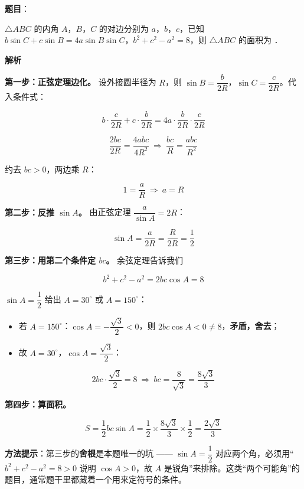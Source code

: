 \begin{answer}

\textbf{题目}：

$\triangle ABC$ 的内角 $A$，$B$，$C$ 的对边分别为 $a$，$b$，$c$，已知 $b\sin C+c\sin B=4a\sin B\sin C$，$b^{2}+c^{2}-a^{2}=8$，则 $\triangle ABC$ 的面积为 \gkblank{}．

\textbf{解析}

\textbf{第一步：正弦定理边化。} 设外接圆半径为 $R$，则 $\sin B=\dfrac b{2R}$，$\sin C=\dfrac c{2R}$。代入条件式：

\nopagebreak[4]
\[b\cdot\frac c{2R}+c\cdot\frac b{2R}=4a\cdot\frac b{2R}\cdot\frac c{2R}\]

\nopagebreak[4]
\[\frac{2bc}{2R}=\frac{4abc}{4R^{2}}\ \Longrightarrow\ \frac{bc}R=\frac{abc}{R^{2}}\]

约去 $bc>0$，两边乘 $R$：

\nopagebreak[4]
\[1=\frac aR\ \Longrightarrow\ a=R\]

\textbf{第二步：反推 $\sin A$。} 由正弦定理 $\dfrac a{\sin A}=2R$：

\nopagebreak[4]
\[\sin A=\frac a{2R}=\frac R{2R}=\frac12\]

\textbf{第三步：用第二个条件定 $bc$。} 余弦定理告诉我们

\nopagebreak[4]
\[b^{2}+c^{2}-a^{2}=2bc\cos A=8\]

$\sin A=\dfrac12$ 给出 $A=30^\circ$ 或 $A=150^\circ$：

\begin{itemize}
\item 若 $A=150^\circ$：$\cos A=-\dfrac{\sqrt3}2<0$，则 $2bc\cos A<0\ne8$，\textbf{矛盾，舍去}；
\item 故 $A=30^\circ$，$\cos A=\dfrac{\sqrt3}2$：
\end{itemize}
\nopagebreak[4]
\[2bc\cdot\frac{\sqrt3}2=8\ \Longrightarrow\ bc=\frac8{\sqrt3}=\frac{8\sqrt3}3\]

\textbf{第四步：算面积。}

\nopagebreak[4]
\[S=\frac12bc\sin A=\frac12\times\frac{8\sqrt3}3\times\frac12=\frac{2\sqrt3}3\]

\begin{gktip}
\textbf{方法提示}：第三步的\textbf{舍根}是本题唯一的坑 —— $\sin A=\dfrac12$ 对应两个角，必须用“$b^{2}+c^{2}-a^{2}=8>0$ 说明 $\cos A>0$，故 $A$ 是锐角”来排除。这类“两个可能角”的题目，通常题干里都藏着一个用来定符号的条件。
\end{gktip}


\par\medskip

\end{answer}


